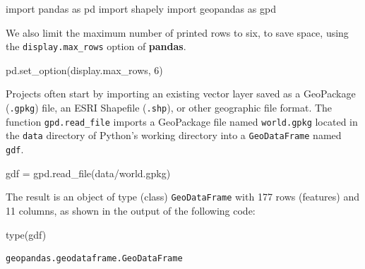 \documentclass[
  letterpaper,
]{krantz}
\newenvironment{Shaded}{\begin{snugshade}}{\end{snugshade}}
\newcommand{\BuiltInTok}[1]{\textcolor[rgb]{0.00,0.23,0.31}{#1}}
\newcommand{\DecValTok}[1]{\textcolor[rgb]{0.68,0.00,0.00}{#1}}
\newcommand{\ImportTok}[1]{\textcolor[rgb]{0.00,0.46,0.62}{#1}}
\newcommand{\NormalTok}[1]{\textcolor[rgb]{0.00,0.23,0.31}{#1}}
\newcommand{\OperatorTok}[1]{\textcolor[rgb]{0.37,0.37,0.37}{#1}}
\newcommand{\StringTok}[1]{\textcolor[rgb]{0.13,0.47,0.30}{#1}}
\begin{document}
\begin{Shaded}
\begin{Highlighting}[]
\ImportTok{import}\NormalTok{ pandas }\ImportTok{as}\NormalTok{ pd}
\ImportTok{import}\NormalTok{ shapely}
\ImportTok{import}\NormalTok{ geopandas }\ImportTok{as}\NormalTok{ gpd}
\end{Highlighting}
\end{Shaded}

We also limit the maximum number of printed rows to six, to save space,
using the \texttt{\textquotesingle{}display.max\_rows\textquotesingle{}}
option of \textbf{pandas}.

\begin{Shaded}
\begin{Highlighting}[]
\NormalTok{pd.set\_option(}\StringTok{\textquotesingle{}display.max\_rows\textquotesingle{}}\NormalTok{, }\DecValTok{6}\NormalTok{)}
\end{Highlighting}
\end{Shaded}

Projects often start by importing an existing vector layer saved as a
GeoPackage (\texttt{.gpkg}) file, an ESRI Shapefile (\texttt{.shp}), or
other geographic file format. The function \texttt{gpd.read\_file}
imports a GeoPackage file named \texttt{world.gpkg} located in the
\texttt{data} directory of Python's working directory into a
\texttt{GeoDataFrame} named \texttt{gdf}.

\begin{Shaded}
\begin{Highlighting}[]
\NormalTok{gdf }\OperatorTok{=}\NormalTok{ gpd.read\_file(}\StringTok{\textquotesingle{}data/world.gpkg\textquotesingle{}}\NormalTok{)}
\end{Highlighting}
\end{Shaded}

The result is an object of type (class) \texttt{GeoDataFrame} with 177
rows (features) and 11 columns, as shown in the output of the following
code:

\begin{Shaded}
\begin{Highlighting}[]
\BuiltInTok{type}\NormalTok{(gdf)}
\end{Highlighting}
\end{Shaded}

\label{typegdf}
\begin{verbatim}
geopandas.geodataframe.GeoDataFrame
\end{verbatim}
\end{document}
